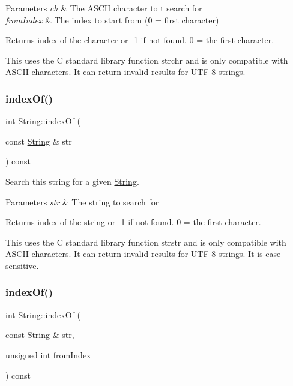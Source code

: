 \begin{DoxyParams}{Parameters}
{\em ch} & The A\+S\+C\+II character to t search for\\
\hline
{\em from\+Index} & The index to start from (0 = first character)\\
\hline
\end{DoxyParams}
\begin{DoxyReturn}{Returns}
index of the character or -\/1 if not found. 0 = the first character.
\end{DoxyReturn}
This uses the C standard library function strchr and is only compatible with A\+S\+C\+II characters. It can return invalid results for U\+T\+F-\/8 strings. \mbox{\label{class_string_ab2fac51c5e56215d0b92a70cce39d966}} 
\subsubsection{\texorpdfstring{index\+Of()}{indexOf()}\hspace{0.1cm}{\footnotesize\ttfamily [3/4]}}
{\footnotesize\ttfamily int String\+::index\+Of (\begin{DoxyParamCaption}\item[{const \hyperlink{class_string}{String} \&}]{str }\end{DoxyParamCaption}) const}



Search this string for a given \hyperlink{class_string}{String}. 


\begin{DoxyParams}{Parameters}
{\em str} & The string to search for\\
\hline
\end{DoxyParams}
\begin{DoxyReturn}{Returns}
index of the string or -\/1 if not found. 0 = the first character.
\end{DoxyReturn}
This uses the C standard library function strstr and is only compatible with A\+S\+C\+II characters. It can return invalid results for U\+T\+F-\/8 strings. It is case-\/sensitive. \mbox{\label{class_string_aecbe2471a60329e53d31bd85c24c38a9}} 
\subsubsection{\texorpdfstring{index\+Of()}{indexOf()}\hspace{0.1cm}{\footnotesize\ttfamily [4/4]}}
{\footnotesize\ttfamily int String\+::index\+Of (\begin{DoxyParamCaption}\item[{const \hyperlink{class_string}{String} \&}]{str,  }\item[{unsigned int}]{from\+Index }\end{DoxyParamCaption}) const}



